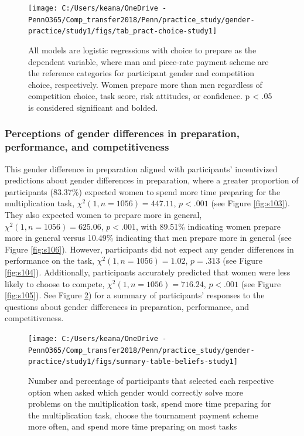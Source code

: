 \documentclass[a4paper, nobind]{templates/ociamthesis}
\begin{document}
\begin{figure}

{\centering \texttt{[image: C:/Users/keana/OneDrive - PennO365/Comp\_transfer2018/Penn/practice\_study/gender-practice/study1/figs/tab\_pract-choice-study1]} 

}

\caption{All models are logistic regressions with choice to prepare as the dependent variable, where man and piece-rate payment scheme are the reference categories for participant gender and competition choice, respectively. Women prepare more than men regardless of competition choice, task score, risk attitudes, or confidence. p < .05 is considered significant and bolded.}\label{fig:tab-pract-choice-study1}
\end{figure}

\hypertarget{perceptions-of-gender-differences-in-preparation-performance-and-competitiveness}{%
\subsubsection{Perceptions of gender differences in preparation, performance, and competitiveness}\label{perceptions-of-gender-differences-in-preparation-performance-and-competitiveness}}

This gender difference in preparation aligned with participants' incentivized predictions about gender differences in preparation, where a greater proportion of participants (83.37\%) expected women to spend more time preparing for the multiplication task, \(\chi^2(1, n = 1056) = 447.11\), \(p < .001\) (see Figure \ref{fig:s103}). They also expected women to prepare more in general, \(\chi^2(1, n = 1056) = 625.06\), \(p < .001\), with 89.51\% indicating women prepare more in general versus 10.49\% indicating that men prepare more in general (see Figure \ref{fig:s106}). However, participants did not expect any gender differences in performance on the task, \(\chi^2(1, n = 1056) = 1.02\), \(p = .313\) (see Figure \ref{fig:s104}). Additionally, participants accurately predicted that women were less likely to choose to compete, \(\chi^2(1, n = 1056) = 716.24\), \(p < .001\) (see Figure \ref{fig:s105}). See Figure \ref{fig:summary-table-beliefs-study1}) for a summary of participants' responses to the questions about gender differences in preparation, performance, and competitiveness.

\begin{figure}

{\centering \texttt{[image: C:/Users/keana/OneDrive - PennO365/Comp\_transfer2018/Penn/practice\_study/gender-practice/study1/figs/summary-table-beliefs-study1]} 

}

\caption{Number and percentage of participants that selected each respective option when asked which gender would correctly solve more problems on the multiplication task, spend more time preparing for the multiplication task, choose the tournament payment scheme more often, and spend more time preparing on most tasks}\label{fig:summary-table-beliefs-study1}
\end{figure}
\end{document}
